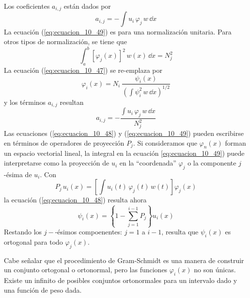 Los coeficientes $a_{i, j}$ están dados por
\begin{equation}
a_{i, j} = - \int u_{i} \, \varphi_{j} \, w \, \dd x
\label{eq:ecuacion_10_49}
\end{equation}
La ecuación (\ref{eq:ecuacion_10_49}) es para una normalización unitaria. Para otros tipos de normalización, se tiene que
\[ \int_{a}^{b} \left[ \varphi_{j} (x) \right]^{2} \, w(x) \, \dd x =  N_{j}^{2} \]
La ecuación (\ref{eq:ecuacion_10_47}) se re-emplaza por
\begin{equation}
\varphi_{i}(x) =  N_{i} \: \dfrac{\psi_{i}(x)}{\left( \int \psi_{i}^{2} \, w \, \dd x \right)^{1/2}}
\label{eq:ecuacion_10_47a}
\end{equation}
y los términos $a_{i,j}$ resultan
\begin{equation}
a_{i, j} = - \dfrac{\int u_{i} \, \varphi_{j} \, w \, \dd x}{N_{j}^{2}}
\label{eq:ecuacion_10_49a}
\end{equation}
Las ecuaciones (\ref{eq:ecuacion_10_48}) y (\ref{eq:ecuacion_10_49}) pueden escribirse en términos de operadores de proyección $P_{j}$. Si consideramos que $\varphi_{n}(x)$ forman un espacio vectorial lineal, la integral en la ecuación \ref{eq:ecuacion_10_49}) puede interpretarse como la proyección de $u_{i}$ en la \enquote{coordenada} $\varphi_{j}$ o la componente $j$-ésima de $u_{i}$. Con
\[ P_{j} \, u_{i}(x) = \left[ \int u_{i}(t) \, \varphi_{j}(t) \, w(t) \right] \varphi_{j}(x) \]
la ecuación (\ref{eq:ecuacion_10_48}) resulta ahora
\begin{equation}
\psi_{i}(x) = \left\{ 1 - \sum_{j=1}^{i-1} P_{j} \right\} u_{i}(x)
\label{eq:ecuacion_10_48a}
\end{equation}
Restando los $j-$-ésimos compoenentes: $j=1$ a $i-1$, resulta que $\psi_{i}(x)$ es ortogonal para todo $\varphi_{j}(x)$.
\par
 Cabe señalar que el procedimiento de Gram-Schmidt es una manera de construir un conjunto ortogonal o ortonormal, pero las funciones $\varphi_{i}(x)$ no son únicas. Existe un infinito de posibles conjuntos ortonormales para un intervalo dado y una función de peso dada.
